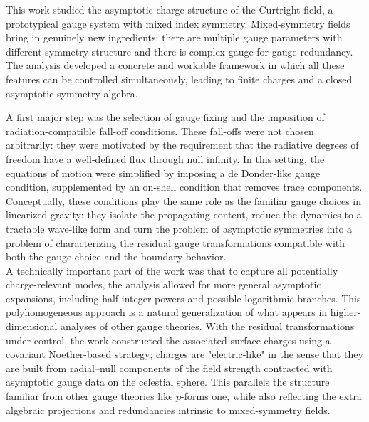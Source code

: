 \documentclass[a4paper,12pt]{article}
\begin{document}
This work studied the asymptotic charge structure of the Curtright field, a prototypical gauge system with mixed index symmetry. Mixed-symmetry fields bring in genuinely new ingredients: there are multiple gauge parameters with different symmetry structure and there is complex gauge-for-gauge redundancy. The analysis developed a concrete and workable framework in which all these features can be controlled simultaneously, leading to finite charges and a closed asymptotic symmetry algebra.

A first major step was the selection of gauge fixing and the imposition of radiation-compatible fall-off conditions. These fall-offs were not chosen arbitrarily: they were motivated by the requirement that the radiative degrees of freedom have a well-defined flux through null infinity. In this setting, the equations of motion were simplified by imposing a de Donder-like gauge condition, supplemented by an on-shell condition that removes trace components. Conceptually, these conditions play the same role as the familiar gauge choices in linearized gravity: they isolate the propagating content, reduce the dynamics to a tractable wave-like form and turn the problem of asymptotic symmetries into a problem of characterizing the residual gauge transformations compatible with both the gauge choice and the boundary behavior.\\
A technically important part of the work was that to capture all potentially charge-relevant modes, the analysis allowed for more general asymptotic expansions, including half-integer powers and possible logarithmic branches. This polyhomogeneous approach is a natural generalization of what appears in higher-dimensional analyses of other gauge theories. With the residual transformations under control, the work constructed the associated surface charges using a covariant Noether-based strategy; charges are "electric-like" in the sense that they are built from radial--null components of the field strength contracted with asymptotic gauge data on the celestial sphere. This parallels the structure familiar from other gauge theories like $p$-forms one, while also reflecting the extra algebraic projections and redundancies intrinsic to mixed-symmetry fields.
\end{document}
